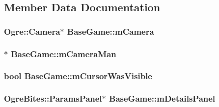 \subsection{Member Data Documentation}
\hypertarget{classBaseGame_ad3c279cdf94f77cd1652ad142a498a04}{
\subsubsection[{m\-Camera}]{\setlength{\rightskip}{0pt plus 5cm}Ogre\-::\-Camera$\ast$ Base\-Game\-::m\-Camera\hspace{0.3cm}{\ttfamily [protected]}}}\label{classBaseGame_ad3c279cdf94f77cd1652ad142a498a04}
\hypertarget{classBaseGame_a5d5ab169e4c7bd09bb624fb2875a7306}{
\subsubsection[{m\-Camera\-Man}]{$\ast$ Base\-Game\-::m\-Camera\-Man\hspace{0.3cm}{\ttfamily [protected]}}}\label{classBaseGame_a5d5ab169e4c7bd09bb624fb2875a7306}
\hypertarget{classBaseGame_a1c4ba8734fb3fee6254afc155062d59c}{
\subsubsection[{m\-Cursor\-Was\-Visible}]{\setlength{\rightskip}{0pt plus 5cm}bool Base\-Game\-::m\-Cursor\-Was\-Visible\hspace{0.3cm}{\ttfamily [protected]}}}\label{classBaseGame_a1c4ba8734fb3fee6254afc155062d59c}
\hypertarget{classBaseGame_ac68de06a1542fc8d4c67ade85a1753c1}{
\subsubsection[{m\-Details\-Panel}]{\setlength{\rightskip}{0pt plus 5cm}Ogre\-Bites\-::\-Params\-Panel$\ast$ Base\-Game\-::m\-Details\-Panel\hspace{0.3cm}{\ttfamily [protected]}}}\label{classBaseGame_ac68de06a1542fc8d4c67ade85a1753c1}

